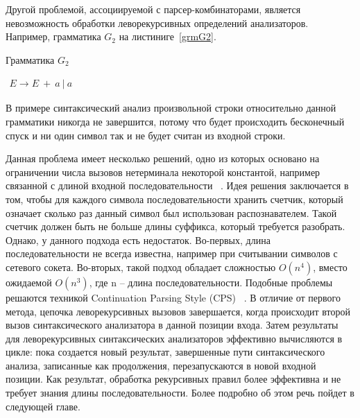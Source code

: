  Другой проблемой, ассоциируемой с парсер-комбинаторами, является невозможность обработки леворекурсивных определений анализаторов. Например, грамматика $G_2$ на листиниге~\ref{grmG2}.

 \begin{listing}
\caption{Грамматика $G_2$}
\label{grmG2}
\centering
$\begin{array}{rl}
E \rightarrow E \ + \ a \ | \ a
\end{array}$
 \end{listing}

 В примере синтаксический анализ произвольной строки относительно данной грамматики никогда не завершится, потому что будет происходить бесконечный спуск и ни один символ так и не будет считан из входной строки. 

 Данная проблема имеет несколько решений, одно из которых основано на ограничении числа вызовов нетерминала некоторой константой, например связанной с длиной входной последовательности ~\cite{ParserComb}. Идея решения заключается в том, чтобы для каждого символа последовательности хранить счетчик, который означает сколько раз данный символ был использован распознавателем. Такой счетчик должен быть не больше длины суффикса, который требуется разобрать. Однако, у данного подхода есть недостаток. Во-первых, длина последовательности не всегда известна, например при считывании символов с сетевого сокета. Во-вторых, такой подход обладает сложностью $O(n^4)$, вместо ожидаемой $O(n^3)$, где n – длина последовательности. Подобные проблемы решаются техникой Continuation Parsing Style (CPS) ~\cite{MemoizationInTopDown}. В отличие от первого метода, цепочка леворекурсивных вызовов завершается, когда происходит второй вызов синтаксического анализатора в данной позиции входа. Затем результаты для леворекурсивных синтаксических анализаторов эффективно вычисляются в цикле: пока создается новый результат, завершенные пути синтаксического анализа, записанные как продолжения, перезапускаются в новой входной позиции. Как результат, обработка рекурсивных правил более эффективна и не требует знания длины последовательности. Более подробно об этом речь пойдет в следующей главе.



